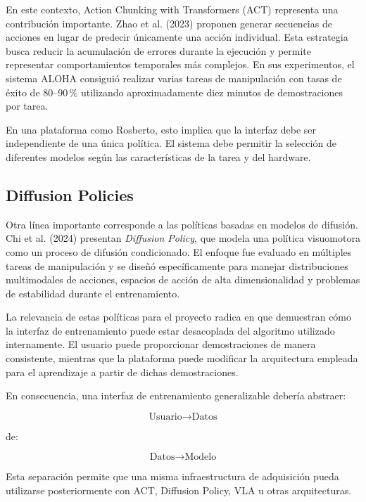 \documentclass[stu,12pt,floatsintext]{apa7}
\begin{document}
En este contexto, Action Chunking with Transformers (ACT) representa una contribución importante. Zhao et al. (2023) proponen generar secuencias de acciones en lugar de predecir únicamente una acción individual. Esta estrategia busca reducir la acumulación de errores durante la ejecución y permite representar comportamientos temporales más complejos. En sus experimentos, el sistema ALOHA consiguió realizar varias tareas de manipulación con tasas de éxito de 80--90\,\% utilizando aproximadamente diez minutos de demostraciones por tarea.

En una plataforma como Rosberto, esto implica que la interfaz debe ser independiente de una única política. El sistema debe permitir la selección de diferentes modelos según las características de la tarea y del hardware.

\subsection{Diffusion Policies}

Otra línea importante corresponde a las políticas basadas en modelos de difusión. Chi et al. (2024) presentan \textit{Diffusion Policy}, que modela una política visuomotora como un proceso de difusión condicionado. El enfoque fue evaluado en múltiples tareas de manipulación y se diseñó específicamente para manejar distribuciones multimodales de acciones, espacios de acción de alta dimensionalidad y problemas de estabilidad durante el entrenamiento.

La relevancia de estas políticas para el proyecto radica en que demuestran cómo la interfaz de entrenamiento puede estar desacoplada del algoritmo utilizado internamente. El usuario puede proporcionar demostraciones de manera consistente, mientras que la plataforma puede modificar la arquitectura empleada para el aprendizaje a partir de dichas demostraciones.

En consecuencia, una interfaz de entrenamiento generalizable debería abstraer:

\begin{equation}
\text{Usuario} \rightarrow \text{Datos}
\end{equation}

de:

\begin{equation}
\text{Datos} \rightarrow \text{Modelo}
\end{equation}

Esta separación permite que una misma infraestructura de adquisición pueda utilizarse posteriormente con ACT, Diffusion Policy, VLA u otras arquitecturas.
\end{document}
